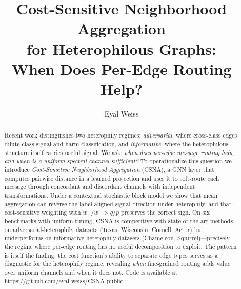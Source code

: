 \documentclass[runningheads]{llncs}
\begin{document}
\title{Cost-Sensitive Neighborhood Aggregation\\for Heterophilous Graphs:\\When Does Per-Edge Routing Help?}


\author{Eyal Weiss}



\maketitle

\begin{abstract}
Recent work distinguishes two heterophily regimes: \emph{adversarial}, where cross-class edges dilute class signal and harm classification, and \emph{informative}, where the heterophilous structure itself carries useful signal.
We ask: \emph{when does per-edge message routing help, and when is a uniform spectral channel sufficient?}
To operationalize this question we introduce \emph{Cost-Sensitive Neighborhood Aggregation} (CSNA), a GNN layer that computes pairwise distance in a learned projection and uses it to soft-route each message through concordant and discordant channels with independent transformations.
Under a contextual stochastic block model we show that mean aggregation can reverse the label-aligned signal direction under heterophily, and that cost-sensitive weighting with $w_+/w_- > q/p$ preserves the correct sign.
On six benchmarks with uniform tuning, CSNA is competitive with state-of-the-art methods on adversarial-heterophily datasets (Texas, Wisconsin, Cornell, Actor) but underperforms on informative-heterophily datasets (Chameleon, Squirrel)---precisely the regime where per-edge routing has no useful decomposition to exploit.
The pattern is itself the finding: the cost function's ability to separate edge types serves as a diagnostic for the heterophily regime, revealing \emph{when} fine-grained routing adds value over uniform channels and when it does not.
Code is available at \url{https://github.com/eyal-weiss/CSNA-public}.

\end{abstract}
\end{document}
